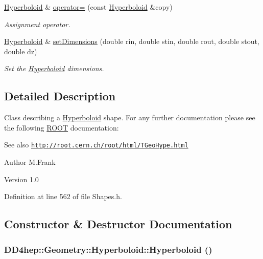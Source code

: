 \begin{DoxyCompactItemize}
\hyperlink{class_d_d4hep_1_1_geometry_1_1_hyperboloid}{Hyperboloid} \& \hyperlink{class_d_d4hep_1_1_geometry_1_1_hyperboloid_a8c67ce2f3b902836c6b4c3b7b0e889c4}{operator=} (const \hyperlink{class_d_d4hep_1_1_geometry_1_1_hyperboloid}{Hyperboloid} \&copy)
\begin{DoxyCompactList}\small\item\em Assignment operator. \item\end{DoxyCompactList}\item 
\hyperlink{class_d_d4hep_1_1_geometry_1_1_hyperboloid}{Hyperboloid} \& \hyperlink{class_d_d4hep_1_1_geometry_1_1_hyperboloid_a17bc3db816fee3f9486603fb799063e2}{setDimensions} (double rin, double stin, double rout, double stout, double dz)
\begin{DoxyCompactList}\small\item\em Set the \hyperlink{class_d_d4hep_1_1_geometry_1_1_hyperboloid}{Hyperboloid} dimensions. \item\end{DoxyCompactList}\end{DoxyCompactItemize}


\subsection{Detailed Description}
Class describing a \hyperlink{class_d_d4hep_1_1_geometry_1_1_hyperboloid}{Hyperboloid} shape. For any further documentation please see the following \hyperlink{namespace_r_o_o_t}{ROOT} documentation: \begin{DoxySeeAlso}{See also}
\href{http://root.cern.ch/root/html/TGeoHype.html}{\tt http://root.cern.ch/root/html/TGeoHype.html}
\end{DoxySeeAlso}
\begin{DoxyAuthor}{Author}
M.Frank 
\end{DoxyAuthor}
\begin{DoxyVersion}{Version}
1.0 
\end{DoxyVersion}


Definition at line 562 of file Shapes.h.

\subsection{Constructor \& Destructor Documentation}
\hypertarget{class_d_d4hep_1_1_geometry_1_1_hyperboloid_afe9a3bdf73ffebe6f16ac8da3af563e7}{
\subsubsection[{Hyperboloid}]{\setlength{\rightskip}{0pt plus 5cm}DD4hep::Geometry::Hyperboloid::Hyperboloid ()}}
\label{class_d_d4hep_1_1_geometry_1_1_hyperboloid_afe9a3bdf73ffebe6f16ac8da3af563e7}


